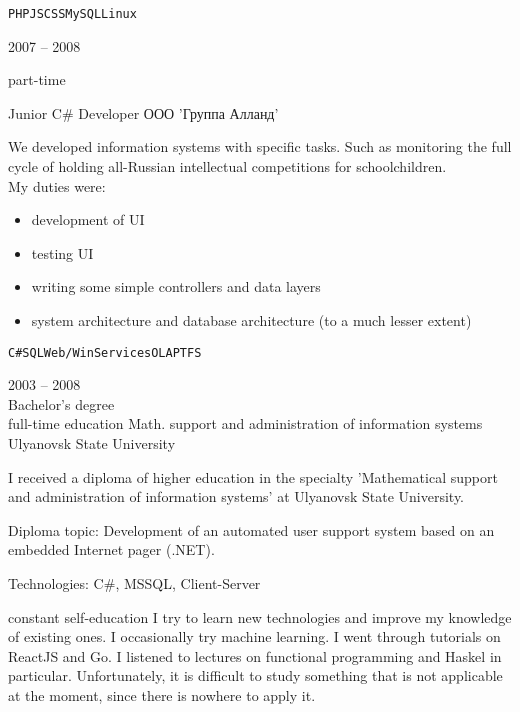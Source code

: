 \begin{entrylist}
{    \texttt{PHP}\slashsep\texttt{JS}\slashsep\texttt{CSS}\slashsep\texttt{MySQL}\slashsep\texttt{Linux}}

	\entry
		{2007 -- 2008

		\footnotesize{part-time}}
		{Junior C\# Developer}
		{ООО 'Группа Алланд'}
		{We developed information systems with specific tasks. Such as monitoring the full cycle of holding all-Russian intellectual competitions for schoolchildren.\\
    My duties were:
    \begin{itemize}
      \item development of UI
      \item testing UI
      \item writing some simple controllers and data layers
      \item system architecture and database architecture (to a much lesser extent)
    \end{itemize}

		\texttt{C\#}\slashsep\texttt{SQL}\slashsep\texttt{Web/WinServices}\slashsep\texttt{OLAP}\slashsep\texttt{TFS}}

\end{entrylist}




\begin{entrylist}
	\entry
		{2003 -- 2008\\\footnotesize{Bachelor's degree\\full-time education}}
		{Math. support and administration of information systems}
		{Ulyanovsk State University}
		{I received a diploma of higher education in the specialty 'Mathematical support and administration of information systems' at Ulyanovsk State University.

    Diploma topic: Development of an automated user support system based on an embedded Internet pager (.NET).

    Technologies: C\#, MSSQL, Client-Server
		}
	\entry
		{constant}
		{self-education}
		{}
		{I try to learn new technologies and improve my knowledge of existing ones. I occasionally try machine learning. I went through tutorials on ReactJS and Go. I listened to lectures on functional programming and Haskel in particular. Unfortunately, it is difficult to study something that is not applicable at the moment, since there is nowhere to apply it.}
\end{entrylist}

